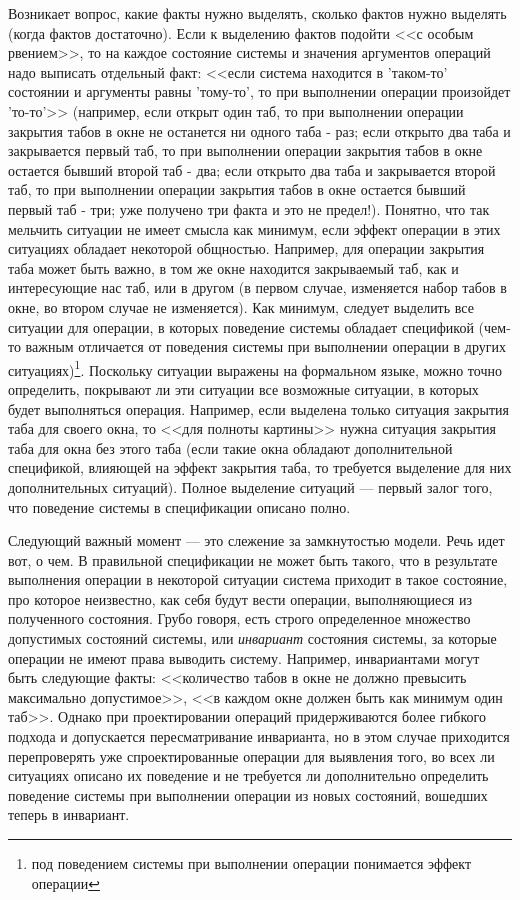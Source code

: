\documentclass[14pt, twoside]{extreport}
\begin{document}
Возникает вопрос, какие факты нужно выделять, сколько фактов нужно выделять (когда фактов достаточно). Если к выделению фактов подойти <<с особым рвением>>, то на каждое состояние системы и значения аргументов операций надо выписать отдельный факт: <<если система находится в 'таком-то' состоянии и аргументы равны 'тому-то', то при выполнении операции произойдет 'то-то'>> (например, если открыт один таб, то при выполнении операции закрытия табов в окне не останется ни одного таба - раз; если открыто два таба и закрывается первый таб, то при выполнении операции закрытия табов в окне остается бывший второй таб - два; если открыто два таба и закрывается второй таб, то при выполнении операции закрытия табов в окне остается бывший первый таб - три; уже получено три факта и это не предел!). Понятно, что так мельчить ситуации не имеет смысла как минимум, если эффект операции в этих ситуациях обладает некоторой общностью. Например, для операции закрытия таба может быть важно, в том же окне находится закрываемый таб, как и интересующие нас таб, или в другом (в первом случае, изменяется набор табов в окне, во втором случае не изменяется). Как минимум, следует выделить все ситуации для операции, в которых поведение системы обладает спецификой (чем-то важным отличается от поведения системы при выполнении операции в других ситуациях)\footnote{под поведением системы при выполнении операции понимается эффект операции}. Поскольку ситуации выражены на формальном языке, можно точно определить, покрывают ли эти ситуации все возможные ситуации, в которых будет выполняться операция. Например, если выделена только ситуация закрытия таба для своего окна, то <<для полноты картины>> нужна ситуация закрытия таба для окна без этого таба (если такие окна обладают дополнительной спецификой, влияющей на эффект закрытия таба, то требуется выделение для них дополнительных ситуаций). Полное выделение ситуаций --- первый залог того, что поведение системы в спецификации описано полно.

Следующий важный момент --- это слежение за замкнутостью модели. Речь идет вот, о чем. В правильной спецификации не может быть такого, что в результате выполнения операции в некоторой ситуации система приходит в такое состояние, про которое неизвестно, как себя будут вести операции, выполняющиеся из полученного состояния. Грубо говоря, есть строго определенное множество допустимых состояний системы, или \emph{инвариант} состояния системы, за которые операции не имеют права выводить систему. Например, инвариантами могут быть следующие факты: <<количество табов в окне не должно превысить максимально допустимое>>, <<в каждом окне должен быть как минимум один таб>>. Однако при проектировании операций придерживаются более гибкого подхода и допускается пересматривание инварианта, но в этом случае приходится перепроверять уже спроектированные операции для выявления того, во всех ли ситуациях описано их поведение и не требуется ли дополнительно определить поведение системы при выполнении операции из новых состояний, вошедших теперь в инвариант.
\end{document}
